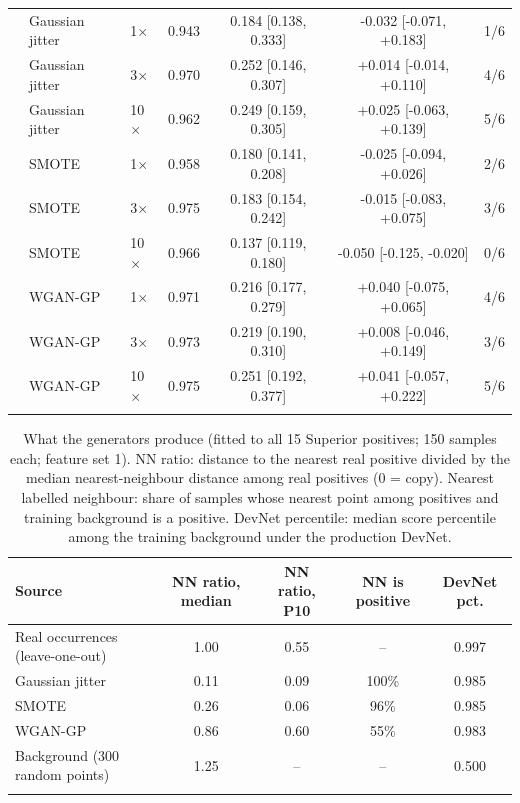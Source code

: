 \documentclass[pdflatex,sn-apa]{sn-jnl}
\begin{document}
\begin{table}[t]
\begin{tabular*}{\textwidth}{@{\extracolsep\fill}lllcccc}
 & Gaussian jitter & 1$\times$ & 0.943 & 0.184 [0.138, 0.333] & -0.032 [-0.071, +0.183] & 1/6 \\
 & Gaussian jitter & 3$\times$ & 0.970 & 0.252 [0.146, 0.307] & +0.014 [-0.014, +0.110] & 4/6 \\
 & Gaussian jitter & 10$\times$ & 0.962 & 0.249 [0.159, 0.305] & +0.025 [-0.063, +0.139] & 5/6 \\
 & SMOTE & 1$\times$ & 0.958 & 0.180 [0.141, 0.208] & -0.025 [-0.094, +0.026] & 2/6 \\
 & SMOTE & 3$\times$ & 0.975 & 0.183 [0.154, 0.242] & -0.015 [-0.083, +0.075] & 3/6 \\
 & SMOTE & 10$\times$ & 0.966 & 0.137 [0.119, 0.180] & -0.050 [-0.125, -0.020] & 0/6 \\
 & WGAN-GP & 1$\times$ & 0.971 & 0.216 [0.177, 0.279] & +0.040 [-0.075, +0.065] & 4/6 \\
 & WGAN-GP & 3$\times$ & 0.973 & 0.219 [0.190, 0.310] & +0.008 [-0.046, +0.149] & 3/6 \\
 & WGAN-GP & 10$\times$ & 0.975 & 0.251 [0.192, 0.377] & +0.041 [-0.057, +0.222] & 5/6 \\
\botrule
\end{tabular*}
\end{table}

\begin{table}[t]
\caption{What the generators produce (fitted to all 15 Superior positives; 150 samples each; feature set 1). NN ratio: distance to the nearest real positive divided by the median nearest-neighbour distance among real positives (0 = copy). Nearest labelled neighbour: share of samples whose nearest point among positives and training background is a positive. DevNet percentile: median score percentile among the training background under the production DevNet.}\label{tab:aug-diag}
\footnotesize
\setlength{\tabcolsep}{2.5pt}
\begin{tabular*}{\textwidth}{@{\extracolsep\fill}lcccc}
\toprule
Source & NN ratio, median & NN ratio, P10 & NN is positive & DevNet pct. \\
\midrule
Real occurrences (leave-one-out) & 1.00 & 0.55 & -- & 0.997 \\
Gaussian jitter & 0.11 & 0.09 & 100\% & 0.985 \\
SMOTE & 0.26 & 0.06 & 96\% & 0.985 \\
WGAN-GP & 0.86 & 0.60 & 55\% & 0.983 \\
Background (300 random points) & 1.25 & -- & -- & 0.500 \\
\botrule
\end{tabular*}
\end{table}
\end{document}
